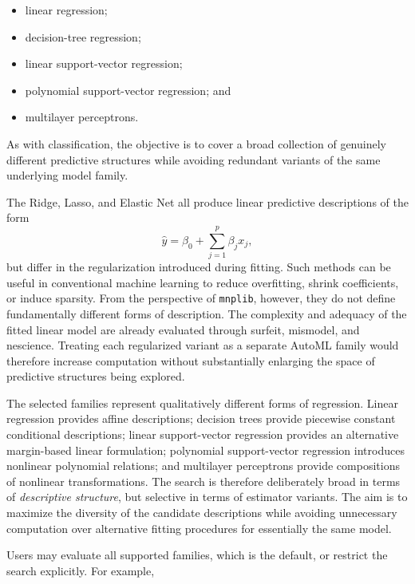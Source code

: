 \begin{itemize}
    \item linear regression;
    \item decision-tree regression;
    \item linear support-vector regression;
    \item polynomial support-vector regression; and
    \item multilayer perceptrons.
\end{itemize}

As with classification, the objective is to cover a broad collection of genuinely different predictive structures while avoiding redundant variants of the same underlying model family.

\begin{example}
The Ridge, Lasso, and Elastic Net all produce linear predictive descriptions of the form
\[
\widehat y = \beta_0+\sum_{j=1}^{p}\beta_jx_j,
\]
but differ in the regularization introduced during fitting. Such methods can be useful in conventional machine learning to reduce overfitting, shrink coefficients, or induce sparsity. From the perspective of \texttt{mnplib}, however, they do not define fundamentally different forms of description. The complexity and adequacy of the fitted linear model are already evaluated through surfeit, mismodel, and nescience. Treating each regularized variant as a separate AutoML family would therefore increase computation without substantially enlarging the space of predictive structures being explored.
\end{example}

The selected families represent qualitatively different forms of regression. Linear regression provides affine descriptions; decision trees provide piecewise constant conditional descriptions; linear support-vector regression provides an alternative margin-based linear formulation; polynomial support-vector regression introduces nonlinear polynomial relations; and multilayer perceptrons provide compositions of nonlinear transformations. The search is therefore deliberately broad in terms of \emph{descriptive structure}, but selective in terms of estimator variants. The aim is to maximize the diversity of the candidate descriptions while avoiding unnecessary computation over alternative fitting procedures for essentially the same model.

Users may evaluate all supported families, which is the default, or restrict the search explicitly. For example,

